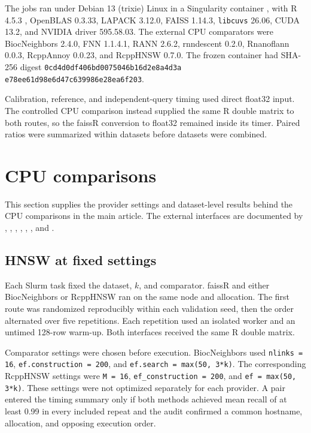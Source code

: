\documentclass[11pt]{article}
\newcommand{\code}[1]{\texttt{#1}}
\newcommand{\pkg}[1]{\textsf{#1}}
\newcommand{\proglang}[1]{\textsf{#1}}
\begin{document}
The jobs ran under Debian 13 (trixie) Linux in a Singularity container
\citep{Singularity}, with \proglang{R} 4.5.3
\citep{R}, OpenBLAS 0.3.33, LAPACK 3.12.0, FAISS 1.14.3,
\code{libcuvs} 26.06, CUDA 13.2, and NVIDIA driver 595.58.03. The external CPU
comparators were \pkg{BiocNeighbors} 2.4.0, \pkg{FNN} 1.1.4.1,
\pkg{RANN} 2.6.2, \pkg{rnndescent} 0.2.0, \pkg{Rnanoflann} 0.0.3,
\pkg{RcppAnnoy} 0.0.23, and \pkg{RcppHNSW} 0.7.0. The frozen container had
SHA-256 digest
\texttt{0cd4d0df406bd007}\allowbreak\texttt{5046b16d2e8a4d3a}\allowbreak
\texttt{e78ee61d98e6d47c}\allowbreak\texttt{639986e28ea6f203}.

Calibration, reference, and independent-query timing used direct float32 input.
The controlled CPU comparison instead supplied the same \proglang{R} double
matrix to both routes, so the \pkg{faissR} conversion to float32 remained inside
its timer. Paired ratios were summarized within datasets before datasets were
combined.

\section{CPU comparisons}
\label{sec:supp-cpu}

This section supplies the provider settings and dataset-level results behind
the CPU comparisons in the main article. The external interfaces are
documented by \citet{BiocNeighbors}, \citet{FNN}, \citet{RANN},
\citet{rnndescent}, \citet{Rnanoflann}, \citet{RcppAnnoy}, and
\citet{RcppHNSW}.

\subsection{HNSW at fixed settings}

Each Slurm task fixed the dataset, $k$, and comparator. \pkg{faissR} and either
\pkg{BiocNeighbors} or \pkg{RcppHNSW} ran on the same node and allocation.
The first route was randomized reproducibly within each validation seed, then
the order alternated over five repetitions. Each repetition used an isolated
worker and an untimed 128-row warm-up. Both interfaces received the same R
double matrix.

Comparator settings were chosen before execution. \pkg{BiocNeighbors} used
\code{nlinks = 16}, \code{ef.construction = 200}, and
\code{ef.search = max(50, 3*k)}. The corresponding \pkg{RcppHNSW} settings
were \code{M = 16}, \code{ef\_construction = 200}, and
\code{ef = max(50, 3*k)}. These settings were not optimized separately for
each provider. A pair entered the timing summary only if both methods
achieved mean recall of at least 0.99 in every included repeat and the audit
confirmed a common hostname, allocation, and opposing execution order.
\end{document}
